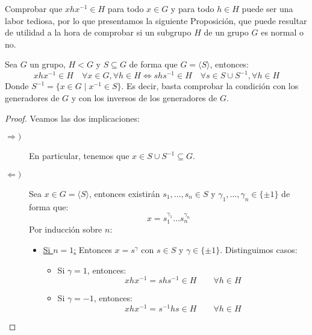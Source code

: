\noindent
Comprobar que $xhx^{-1}\in H$ para todo $x\in G$ y para todo $h\in H$ puede ser una labor tediosa, por lo que presentamos la siguiente Proposición, que puede resultar de utilidad a la hora de comprobar si un subgrupo $H$ de un grupo $G$ es normal o no.
\begin{prop}\label{prop:normal_generadores}
    Sea $G$ un grupo, $H<G$ y $S\subseteq G$ de forma que $G=\langle S \rangle $, entonces:
    \begin{equation*}
        xhx^{-1}\in H \quad \forall x\in G, \forall h\in H \Longleftrightarrow shs^{-1}\in H \quad \forall s\in S\cup S^{-1}, \forall h\in H
    \end{equation*}
    Donde $S^{-1} = \{x\in G \mid x^{-1}\in S\}$. Es decir, basta comprobar la condición con los generadores de $G$ y con los inversos de los generadores de $G$.
    \begin{proof}
        Veamos las dos implicaciones:
        \begin{description}
            \item [$\Longrightarrow)$] En particular, tenemos que $x\in S\cup S^{-1}\subseteq G$.
            \item [$\Longleftarrow)$] Sea $x\in G=\langle S \rangle $, entonces existirán $s_1,\ldots,s_n\in S$ y $\gamma_1,\ldots,\gamma_n \in \{\pm 1\}$ de forma que:
                \begin{equation*}
                    x = s_1^{\gamma_1}\ldots s_n^{\gamma_n}
                \end{equation*}
                Por inducción sobre $n$:
                \begin{itemize}
                    \item \underline{Si $n=1$:} Entonces $x=s^{\gamma}$ con $s\in S$ y $\gamma\in \{\pm 1\}$. Distinguimos casos:
                        \begin{itemize}
                            \item Si $\gamma=1$, entonces:
                                \begin{equation*}
                                    xhx^{-1} = shs^{-1} \in H \qquad \forall h\in H
                                \end{equation*}
                            \item Si $\gamma=-1$, entonces:
                                \begin{equation*}
                                    xhx^{-1} = s^{-1}hs \in H \qquad \forall h\in H
                                \end{equation*}

\end{itemize}
\end{itemize}
\end{description}
\end{proof}
\end{prop}
